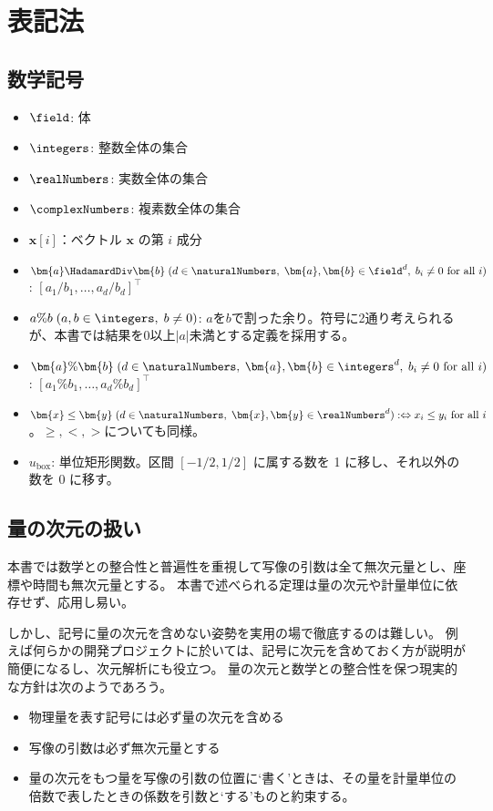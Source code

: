 \part{表記法}
	\chapter{数学記号}
		\newcommand*{\uBox}{u_\text{box}}
		\begin{itemize}
			\item $\field$: 体
			\item $\integers$: 整数全体の集合
			\item $\realNumbers$: 実数全体の集合
			\item $\complexNumbers$: 複素数全体の集合
			\item $\bm{x}[i]$：ベクトル $\bm{x}$ の第 $i$ 成分
			\item $\bm{a} \HadamardDiv \bm{b}\;(d \in \naturalNumbers,\;\bm{a},\bm{b} \in \field^d,\;b_i\neq 0 \text{ for all }i)$: $[a_1/b_1,\dots,a_d/b_d]^\top$
			\item $a\%b\;(a,b\in\integers,\;b\neq 0)$: $a$を$b$で割った余り。符号に2通り考えられるが、本書では結果を0以上$|a|$未満とする定義を採用する。
			\item $\bm{a}\%\bm{b}\;(d\in\naturalNumbers,\;\bm{a},\bm{b} \in \integers^d,\; b_i\neq 0 \text{ for all }i)$: $[a_1\%b_1,\dots,a_d\%b_d]^\top$
			\item $\bm{x} \leq \bm{y}\;(d\in\naturalNumbers,\;\bm{x},\bm{y} \in \realNumbers^d) :\Leftrightarrow x_i \leq y_i \text{ for all }i$。$\geq, <, >$についても同様。
			\item $\uBox$: 単位矩形関数。区間 $[-1/2,1/2]$ に属する数を 1 に移し、それ以外の数を 0 に移す。
		\end{itemize}
	\chapter{量の次元の扱い}
		本書では数学との整合性と普遍性を重視して写像の引数は全て無次元量とし、座標や時間も無次元量とする。
		本書で述べられる定理は量の次元や計量単位に依存せず、応用し易い。
		\par
		しかし、記号に量の次元を含めない姿勢を実用の場で徹底するのは難しい。
		例えば何らかの開発プロジェクトに於いては、記号に次元を含めておく方が説明が簡便になるし、次元解析にも役立つ。
		量の次元と数学との整合性を保つ現実的な方針は次のようであろう。
		\begin{itemize}
			\item 物理量を表す記号には必ず量の次元を含める
			\item 写像の引数は必ず無次元量とする
			\item 量の次元をもつ量を写像の引数の位置に‘書く’ときは、その量を計量単位の倍数で表したときの係数を引数と‘する’ものと約束する。
		\end{itemize}

